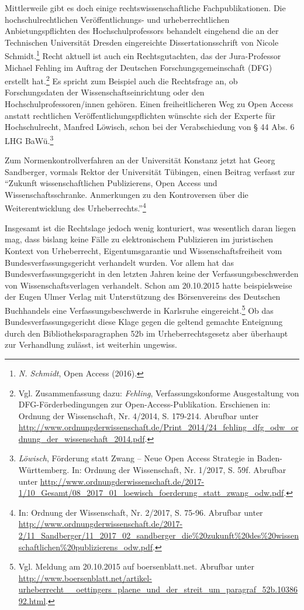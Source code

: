 \documentclass[a4paper,
fontsize=11pt,
oneside,
numbers=noperiodatend,
parskip=half-,
bibliography=totoc,
final
]{scrartcl}
\begin{document}
Mittlerweile gibt es doch einige rechtswissenschaftliche
Fachpublikationen. Die hochschulrechtlichen Veröffentlichungs- und
urheberrechtlichen Anbietungspflichten des Hochschulprofessors behandelt
eingehend die an der Technischen Universität Dresden eingereichte
Dissertationsschrift von Nicole Schmidt.\footnote{\emph{N. Schmidt},
  Open Access (2016).} Recht aktuell ist auch ein Rechtsgutachten, das
der Jura-Professor Michael Fehling im Auftrag der Deutschen
Forschungsgemeinschaft (DFG) erstellt hat.\footnote{Vgl. Zusammenfassung
  dazu: \emph{Fehling}, Verfassungskonforme Ausgestaltung von
  DFG-Förderbedingungen zur Open-Access-Publikation. Erschienen in:
  Ordnung der Wissenschaft, Nr. 4/2014, S. 179-214. Abrufbar unter
  \url{http://www.ordnungderwissenschaft.de/Print_2014/24_fehling_dfg_odw_ordnung_der_wissenschaft_2014.pdf}.}
Es spricht zum Beispiel auch die Rechtsfrage an, ob Forschungsdaten der
Wissenschaftseinrichtung oder den Hochschulprofessoren/innen gehören.
Einen freiheitlicheren Weg zu Open Access anstatt rechtlichen
Veröffentlichungspflichten wünschte sich der Experte für Hochschulrecht,
Manfred Löwisch, schon bei der Verabschiedung von § 44 Abs. 6 LHG
BaWü.\footnote{\emph{Löwisch}, Förderung statt Zwang -- Neue Open Access
  Strategie in Baden-Württemberg. In: Ordnung der Wissenschaft, Nr.
  1/2017, S. 59f. Abrufbar unter
  \url{http://www.ordnungderwissenschaft.de/2017-1/10_Gesamt/08_2017_01_loewisch_foerderung_statt_zwang_odw.pdf}.}

Zum Normenkontrollverfahren an der Universität Konstanz jetzt hat Georg
Sandberger, vormals Rektor der Universität Tübingen, einen Beitrag
verfasst zur \enquote{Zukunft wissenschaftlichen Publizierens, Open
Access und Wissenschaftsschranke. Anmerkungen zu den Kontroversen über
die Weiterentwicklung des Urheberrechts.}\footnote{In: Ordnung der
  Wissenschaft, Nr. 2/2017, S. 75-96. Abrufbar unter
  \url{http://www.ordnungderwissenschaft.de/2017-2/11_Sandberger/11_2017_02_sandberger_die\%20zukunft\%20des\%20wissenschaftlichen\%20publizierens_odw.pdf}.}

Insgesamt ist die Rechtslage jedoch wenig konturiert, was wesentlich
daran liegen mag, dass bislang keine Fälle zu elektronischem Publizieren
im juristischen Kontext von Urheberrecht, Eigentumsgarantie und
Wissenschaftsfreiheit vom Bundesverfassungsgericht verhandelt wurden.
Vor allem hat das Bundesverfassungsgericht in den letzten Jahren keine
der Verfassungsbeschwerden von Wissenschaftsverlagen verhandelt. Schon
am 20.10.2015 hatte beispielsweise der Eugen Ulmer Verlag mit
Unterstützung des Börsenvereins des Deutschen Buchhandels eine
Verfassungsbeschwerde in Karlsruhe eingereicht.\footnote{Vgl. Meldung am
  20.10.2015 auf boersenblatt.net. Abrufbar unter
  \url{http://www.boersenblatt.net/artikel-urheberrecht__oettingers_plaene_und_der_streit_um_paragraf_52b.1038692.html}.}
Ob das Bundesverfassungsgericht diese Klage gegen die geltend gemachte
Enteignung durch den Bibliotheksparagraphen 52b im Urheberrechtsgesetz
aber überhaupt zur Verhandlung zulässt, ist weiterhin ungewiss.
\end{document}
